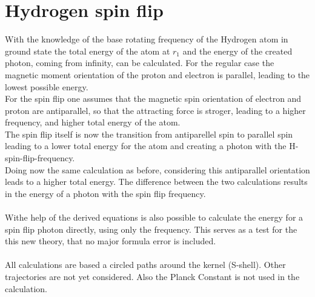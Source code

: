 \documentclass[10pt,titlepage]{article}
\begin{document}

\section{Hydrogen spin flip}

With the knowledge of the base rotating frequency of the Hydrogen atom in ground state the total energy of the atom at $r_1$ and the energy of the created photon, coming from infinity, can be calculated. For the regular case the magnetic moment orientation of the proton and electron is parallel, leading to the lowest possible energy.
\\
For the spin flip one assumes that the magnetic spin orientation of electron and proton are antiparallel, so that the attracting force is stroger, leading to a higher frequency, and higher total energy of the atom.
\\
The spin flip itself is now the transition from antiparellel spin to parallel spin leading to a lower total energy for the atom and creating a photon with the H-spin-flip-frequency.
\\
Doing now the same calculation as before, considering this antiparallel orientation leads to a higher total energy. The difference between the two calculations results in the energy of a photon with the spin flip frequency.
\\\\
Withe help of the derived equations is also possible to calculate the energy for a spin flip photon directly, using only the frequency. 
This serves as a test for the this new theory, that no major formula error is included.
\\\\
All calculations are based a circled paths around the kernel (S-shell).  Other trajectories are not yet considered. Also the Planck Constant is not used in the calculation.

\end{document}

